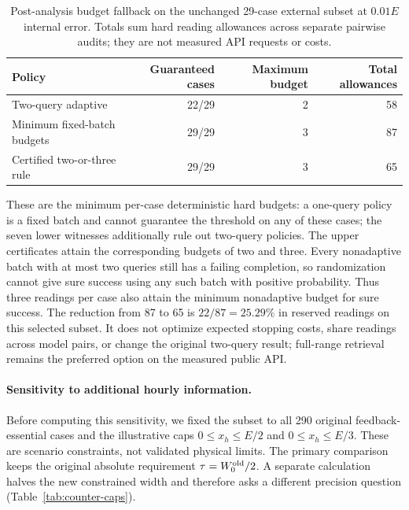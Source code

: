 \begin{table}[htbp]\centering\small
\caption{Post-analysis budget fallback on the unchanged 29-case external
subset at $0.01E$ internal error. Totals sum hard reading allowances across
separate pairwise audits; they are not measured API requests or costs.}
\label{tab:stored-error-fallback}
\begin{tabular}{lrrr}\toprule
Policy & Guaranteed cases & Maximum budget & Total allowances\\\midrule
Two-query adaptive & 22/29 & 2 & 58\\
Minimum fixed-batch budgets & 29/29 & 3 & 87\\
Certified two-or-three rule & 29/29 & 3 & 65\\\bottomrule
\end{tabular}\end{table}

These are the minimum per-case deterministic hard budgets: a one-query
policy is a fixed batch and cannot guarantee the threshold on any of these
cases; the seven lower witnesses additionally rule out two-query policies.
The upper certificates attain the corresponding budgets of two and three.
Every nonadaptive batch with at most two queries still has a failing
completion, so randomization cannot give sure success using any such batch
with positive probability. Thus three readings per case also attain the
minimum nonadaptive budget for sure success. The reduction from 87 to 65 is
$22/87=25.29\%$ in reserved readings on this selected subset. It does not
optimize expected stopping costs, share readings across model pairs, or
change the original two-query result; full-range retrieval remains the
preferred option on the measured public API.
\FloatBarrier
\paragraph{Sensitivity to additional hourly information.}
Before computing this sensitivity, we fixed the subset to all 290
original feedback-essential cases and the illustrative caps
$0\leq x_h\leq E/2$ and $0\leq x_h\leq E/3$.
These are scenario constraints, not validated physical limits. The primary comparison
keeps the original absolute requirement $\tau=W_0^{\rm old}/2$.
A separate calculation halves the new constrained width and therefore
asks a different precision question (Table~\ref{tab:counter-caps}).

